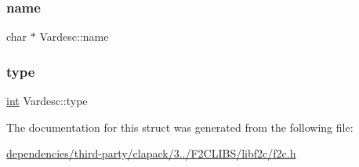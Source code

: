\mbox{\label{struct_vardesc_af375ebb23b8ee48cb92ec4dc3b946bdb}} 
\subsubsection{\texorpdfstring{name}{name}}
{\footnotesize\ttfamily char $\ast$ Vardesc\+::name}

\mbox{\label{struct_vardesc_ac901f905f9cf2c9011684b7e612cc16c}} 
\subsubsection{\texorpdfstring{type}{type}}
{\footnotesize\ttfamily \hyperlink{lp__lib_8h_adeb9ec6400320e4923ac9d836d509ddb}{int} Vardesc\+::type}



The documentation for this struct was generated from the following file\+:\begin{DoxyCompactItemize}
\item 
\hyperlink{dependencies_2third-party_2clapack_23_82_81_2_f2_c_l_i_b_s_2libf2c_2f2c_8h}{dependencies/third-\/party/clapack/3../\+F2\+C\+L\+I\+B\+S/libf2c/f2c.\+h}\end{DoxyCompactItemize}
